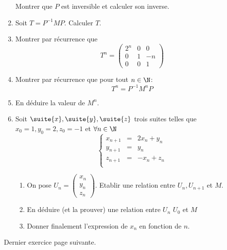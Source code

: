 \documentclass[a4paper, 11pt,reqno]{article}
\begin{document}
\begin{exercice}
\begin{enumerate}
 Montrer que $P$ est inversible et calculer son inverse. 
 \item Soit $T=P^{-1}MP$. Calculer $T$. 
  \item Montrer par récurrence que 
$$T^n = \left(\begin{array}{ccc}  
2^n&0&0 \\
0 &1&-n \\
0&0&1 
\end{array}\right)$$
 \item Montrer par récurrence que pour tout $n\in \N$: 
 $$T^n = P^{-1}M^n P$$
\item En déduire la valeur de $M^n$.
\item Soit $\suite{x}, \suite{y}, \suite{z}$ trois suites telles que $x_0=1, y_0=2, z_0=-1$ et $\forall n\in \N$
$$\left\{ \begin{array}{ccc}
x_{n+1} &=& 2x_n+y_n\\
y_{n+1} &= & y_n\\
z_{n+1} &= & -x_n+z_n\\
\end{array}\right.$$
\begin{enumerate}
\item On pose $U_n =\left(\begin{array}{c}
x_n\\
y_n\\
z_n
\end{array}   \right)$. Etablir une relation entre $U_n, U_{n+1}$ et $M$.
\item En déduire  (et la prouver) une relation entre $U_n$ $U_0$ et $M$
\item Donner finalement l'expression de $x_n$ en fonction de $n$. 
\end{enumerate}

\end{enumerate}
\end{exercice}

\vspace{3cm}
\begin{center}
Dernier exercice page suivante.
\end{center}
\end{document}
